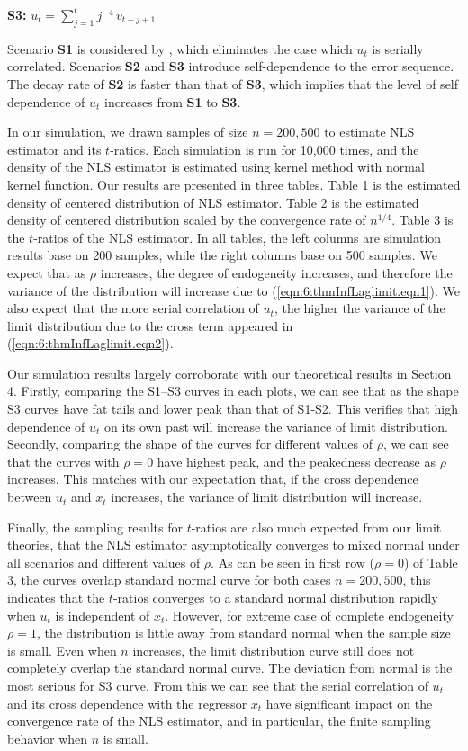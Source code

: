 {\bf S3:} $u_t = \sum_{j = 1}^t j^{-4}\,  v_{t-j+1}$

\medskip
\noindent Scenario {\bf S1} is considered by \cite{changpark2010}, which eliminates the case which $u_t$ is serially correlated. Scenarios {\bf S2} and {\bf S3} introduce self-dependence to the error sequence. The decay rate of {\bf S2} is faster than that of {\bf S3}, which implies that the level of self dependence of $u_t$ increases from {\bf S1} to {\bf S3}.

In our simulation, we drawn samples of size  $n = 200, 500$ to estimate NLS estimator and its $t$-ratios. Each simulation is run for 10,000 times, and the density of the NLS estimator is estimated using kernel method with normal kernel function. Our results are presented in three tables. Table 1 is the estimated density of centered distribution of NLS estimator. Table 2 is the estimated density of centered distribution scaled by the convergence rate of $n^{1/4}$. Table 3 is the $t$-ratios of the NLS estimator. In all tables, the left columns are simulation results base on 200 samples, while the right columns base on 500 samples. We expect that as $\rho$ increases, the degree of endogeneity increases, and therefore the variance of the distribution will increase due to (\ref{eqn:6:thmInfLaglimit.eqn1}). We also expect that the more serial correlation of $u_t$, the higher the variance of the limit distribution  due to the cross term appeared in (\ref{eqn:6:thmInfLaglimit.eqn2}).

Our simulation results largely corroborate with our theoretical results in Section 4. Firstly, comparing the S1--S3 curves in each plots, we can see that as the shape S3 curves have fat tails and lower peak than that of S1-S2. This verifies that high dependence of $u_t$ on its own past will increase the variance of limit distribution. Secondly, comparing the shape of the curves for different values of $\rho$, we can see that the curves with $\rho = 0$ have highest peak, and the peakedness decrease as $\rho$ increases. This matches with our expectation that, if the cross dependence between $u_t$ and $x_t$ increases, the variance of limit distribution will increase.

Finally, the sampling results for $t$-ratios are also much expected from our limit theories, that the NLS estimator asymptotically converges to mixed normal under all scenarios and different values of $\rho$. As can be seen in first row ($\rho = 0$) of Table 3, the curves overlap standard normal curve for both cases $n = 200, 500$, this indicates that the $t$-ratios converges to a standard normal distribution rapidly when $u_t$ is independent of $x_t$. However, for extreme case of complete endogeneity $\rho = 1$, the distribution is little away from standard normal when the sample size is small. Even when $n$ increases, the limit distribution curve still does not completely overlap the standard normal curve. The deviation from normal is the most serious for S3 curve. From this we can see that the serial correlation of $u_t$ and its cross dependence with the regressor $x_t$ have significant impact on the convergence rate of the NLS estimator, and in particular, the finite sampling behavior when $n$ is small.

